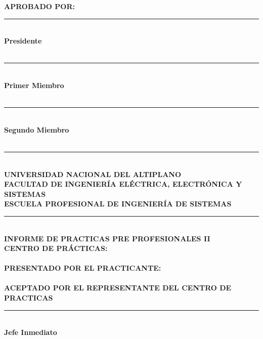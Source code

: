 \begin{titlepage}
    {\small{\textbf{ APROBADO POR: }}} \\[85pt]

    \textcolor{black}{\rule{0.5\linewidth}{0.80mm}} \\[1pt]
    {\small{\textbf{ Presidente }}} \\
    {\small{\textbf{ \Precidente }}} \\
    \vfill

    \textcolor{black}{\rule{0.5\linewidth}{0.80mm}} \\[1pt]
    {\small{\textbf{ Primer Miembro }}} \\
    {\small{\textbf{ \PrimerMiembro }}} \\
    \vfill

    \textcolor{black}{\rule{0.5\linewidth}{0.80mm}} \\[1pt]
    {\small{\textbf{ Segundo Miembro }}} \\
    {\small{\textbf{ \SegundoMiembro }}} \\
    \vfill

\newpage
    \textcolor{black}{\rule{0.8\linewidth}{0.80mm}} \\[1pt]
    {\small{\textbf{ UNIVERSIDAD NACIONAL DEL ALTIPLANO \\[1pt]
    FACULTAD DE INGENIERÍA ELÉCTRICA, ELECTRÓNICA Y SISTEMAS \\[1pt]
    ESCUELA PROFESIONAL DE INGENIERÍA DE SISTEMAS 
     }}} \\[1pt]
    \textcolor{black}{\rule{0.8\linewidth}{0.80mm}} \\[15pt]  
    {\small{\textbf{ INFORME DE PRACTICAS PRE PROFESIONALES II }}}\\[15pt]

    {\small{\textbf{ CENTRO DE PRÁCTICAS: }}} \\
    {\small{\textbf{ \InstitucionNombre }}} \\[15pt]

    {\small{\textbf{ PRESENTADO POR EL PRACTICANTE: }}} \\
    {\small{\textbf{ \PracticanteNombre }}} \\[35pt]

    {\small{\textbf{ ACEPTADO POR EL REPRESENTANTE DEL CENTRO DE PRACTICAS }}} \\[115pt]

    \textcolor{black}{\rule{0.5\linewidth}{0.80mm}} \\[1pt]
    {\small{\textbf{ Jefe Inmediato }}} \\
    {\small{\textbf{ \InstitucionJefa }}} \\

\end{titlepage}
